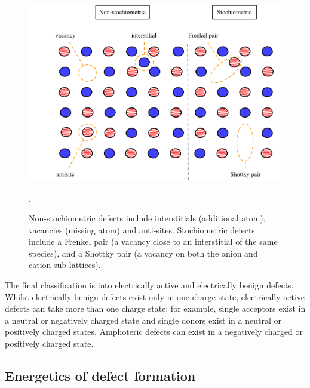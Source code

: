 \begin{figure}[h]
\centering
  \includegraphics[resolution=350]{figures/ch3/classification.png}
  \caption[Classification of crystal point-defects]{Non-stochiometric defects include interstitials (additional atom), vacancies (missing atom) and anti-sites. Stochiometric defects include a Frenkel pair (a vacancy close to an interstitial of the same species), and a Shottky pair (a vacancy on both the anion and cation sub-lattices).}
  \label{classification} . %
\end{figure}

The final classification is into electrically active and electrically benign defects. Whilst electrically benign defects exist only in one charge state, electrically active defects can take more than one charge state; for example, single acceptors exist in a neutral or negatively charged state and single donors exist in a neutral or positively charged states. Amphoteric defects can exist in a negatively charged or positively charged state.

\subsection{Energetics of defect formation} \label{defectformation}

